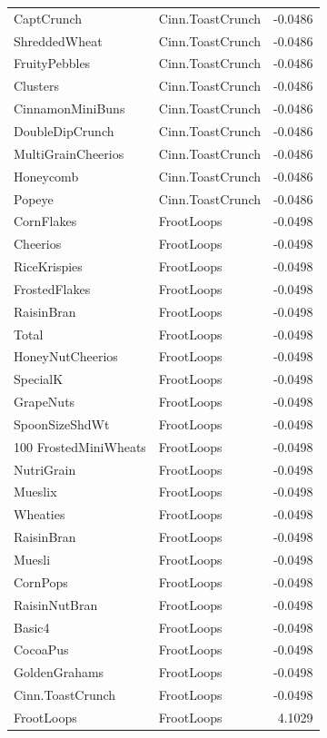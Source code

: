 \begin{longtable}{llr}
CaptCrunch & Cinn.ToastCrunch & -0.0486 \\
ShreddedWheat & Cinn.ToastCrunch & -0.0486 \\
FruityPebbles & Cinn.ToastCrunch & -0.0486 \\
Clusters & Cinn.ToastCrunch & -0.0486 \\
CinnamonMiniBuns & Cinn.ToastCrunch & -0.0486 \\
DoubleDipCrunch & Cinn.ToastCrunch & -0.0486 \\
MultiGrainCheerios & Cinn.ToastCrunch & -0.0486 \\
Honeycomb & Cinn.ToastCrunch & -0.0486 \\
Popeye & Cinn.ToastCrunch & -0.0486 \\
CornFlakes & FrootLoops & -0.0498 \\
Cheerios & FrootLoops & -0.0498 \\
RiceKrispies & FrootLoops & -0.0498 \\
FrostedFlakes & FrootLoops & -0.0498 \\
RaisinBran & FrootLoops & -0.0498 \\
Total & FrootLoops & -0.0498 \\
HoneyNutCheerios & FrootLoops & -0.0498 \\
SpecialK & FrootLoops & -0.0498 \\
GrapeNuts & FrootLoops & -0.0498 \\
SpoonSizeShdWt & FrootLoops & -0.0498 \\
100%
FrostedMiniWheats & FrootLoops & -0.0498 \\
NutriGrain & FrootLoops & -0.0498 \\
Mueslix & FrootLoops & -0.0498 \\
Wheaties & FrootLoops & -0.0498 \\
RaisinBran & FrootLoops & -0.0498 \\
Muesli & FrootLoops & -0.0498 \\
CornPops & FrootLoops & -0.0498 \\
RaisinNutBran & FrootLoops & -0.0498 \\
Basic4 & FrootLoops & -0.0498 \\
CocoaPus & FrootLoops & -0.0498 \\
GoldenGrahams & FrootLoops & -0.0498 \\
Cinn.ToastCrunch & FrootLoops & -0.0498 \\
FrootLoops & FrootLoops & 4.1029 \\

\end{longtable}
